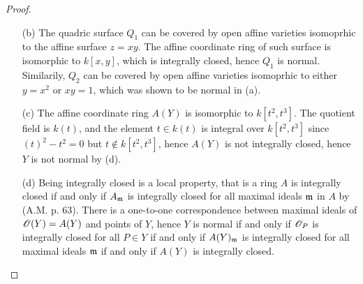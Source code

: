 \documentclass{article}
\begin{document}
\begin{enumerate} [label=\textbf{\arabic*.}, leftmargin=-0.05em]
\begin{proof}
\begin{itemize} [leftmargin=0cm]
    Now suppose $\Delta^2 = B^2 - 4AC \neq 0$ and assume $A \neq 0$, then we have
    \begin{equation*}
        f(x, y) = \bigg( \sqrt{A} x + \frac{B + \Delta}{2\sqrt{A}} y \bigg)  \bigg( \sqrt{A} x + \frac{B - \Delta}{2\sqrt{A}} y \bigg) + Dx + Ey + F,
    \end{equation*}
    so we can apply the affine transformation
    \begin{align*}
        \sqrt{A} x + \frac{B + \Delta}{2\sqrt{A}} y & \mapsto x \\
        \sqrt{A} x + \frac{B - \Delta}{2\sqrt{A}} y & \mapsto y
    \end{align*}
    which has determinant $1/\Delta \neq 0$, to obtain
    \begin{equation*}
        f'(x, y) = xy + (\text{linear terms}).
    \end{equation*}

    Since affine coordinate rings are invariant up to affine transformations, we have either $A(X) \simeq R$ or $A(X) \simeq S$.
    The ring $R = k[x, y] / (y - x^2)$ is isomorphic to a polynomial ring over one variable, which is a factorial, hence it is integrally closed. The ring $S = k[x, x^{-1}]$ is a discrete valuation ring, which are integrally closed by (A.M. p. 94).

    \item[(b)] The quadric surface $Q_1$ can be covered by open affine varieties isomoprhic to the affine surface $z = xy$.
    The affine coordinate ring of such surface is isomorphic to $k[x, y]$, which is integrally closed, hence $Q_1$ is normal.
    Similarily, $Q_2$ can be covered by open affine varieties isomoprhic to either $y = x^2$ or $xy = 1$, which was shown to be normal in (a).

    \item[(c)] The affine coordinate ring $A(Y)$ is isomorphic to $k[t^2, t^3]$. The quotient field is $k(t)$, and the element $t \in k(t)$ is integral over $k[t^2, t^3]$ since $(t)^2 - t^2 = 0$ but $t \notin k[t^2, t^3]$, hence $A(Y)$ is not integrally closed, hence $Y$ is not normal by (d).

    \item[(d)] Being integrally closed is a local property, that is a ring $A$ is integrally closed if and only if $A_{\mathfrak{m}}$ is integrally closed for all maximal ideals $\mathfrak{m}$ in $A$ by (A.M. p. 63). There is a one-to-one correspondence between maximal ideals of $\mathscr{O}(Y) = A(Y)$ and points of $Y$, hence $Y$ is normal if and only if $\mathscr{O}_P$ is integrally closed for all $P \in Y$ if and only if $A(Y)_{\mathfrak{m}}$ is integrally closed for all maximal ideals $\mathfrak{m}$ if and only if $A(Y)$ is integrally closed.


\end{itemize}
\end{proof}
\end{enumerate}
\end{document}
